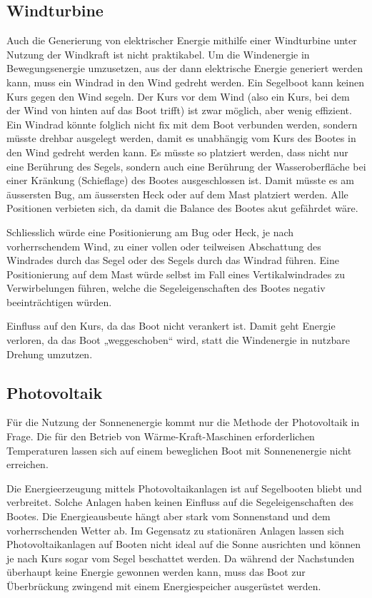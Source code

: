 \subsection{Windturbine}
Auch die Generierung von elektrischer Energie mithilfe einer Windturbine unter Nutzung der Windkraft ist nicht praktikabel. Um die Windenergie in Bewegungsenergie umzusetzen, aus der dann elektrische Energie generiert werden kann, muss ein Windrad in den Wind gedreht werden. Ein Segelboot kann keinen Kurs gegen den Wind segeln. Der Kurs vor dem Wind (also ein Kurs, bei dem der Wind von hinten auf das Boot trifft) ist zwar möglich, aber wenig effizient. Ein Windrad könnte folglich nicht fix mit dem Boot verbunden werden, sondern müsste drehbar ausgelegt werden, damit es unabhängig vom Kurs des Bootes in den Wind gedreht werden kann. Es müsste so platziert werden, dass nicht nur eine Berührung des Segels, sondern auch eine Berührung der Wasseroberfläche bei einer Kränkung (Schieflage) des Bootes ausgeschlossen ist. Damit müsste es am äussersten Bug, am äussersten Heck oder auf dem Mast platziert werden. Alle Positionen verbieten sich, da damit die Balance des Bootes akut gefährdet wäre. 

Schliesslich würde eine Positionierung am Bug oder Heck, je nach vorherrschendem Wind, zu einer vollen oder teilweisen Abschattung des Windrades durch das Segel oder des Segels durch das Windrad führen. Eine Positionierung auf dem Mast würde selbst im Fall eines Vertikalwindrades zu Verwirbelungen führen, welche die Segeleigenschaften des Bootes negativ beeinträchtigen würden. 

Einfluss auf den Kurs, da das Boot nicht verankert ist. Damit geht Energie verloren, da das Boot „weggeschoben“ wird, statt die Windenergie in nutzbare Drehung umzutzen.

\subsection{Photovoltaik}
Für die Nutzung der Sonnenenergie kommt nur die Methode der Photovoltaik in Frage. Die für den Betrieb von Wärme-Kraft-Maschinen erforderlichen Temperaturen lassen sich auf einem beweglichen Boot mit Sonnenenergie nicht erreichen.

Die Energieerzeugung mittels Photovoltaikanlagen ist auf Segelbooten bliebt und verbreitet. Solche Anlagen haben keinen Einfluss auf die Segeleigenschaften des Bootes. Die Energieausbeute hängt aber stark vom Sonnenstand und dem vorherrschenden Wetter ab. Im Gegensatz zu stationären Anlagen lassen sich Photovoltaikanlagen auf Booten nicht ideal auf die Sonne ausrichten und können je nach Kurs sogar vom Segel beschattet werden. Da während der Nachstunden überhaupt keine Energie gewonnen werden kann, muss das Boot zur Überbrückung zwingend mit einem Energiespeicher ausgerüstet werden.

